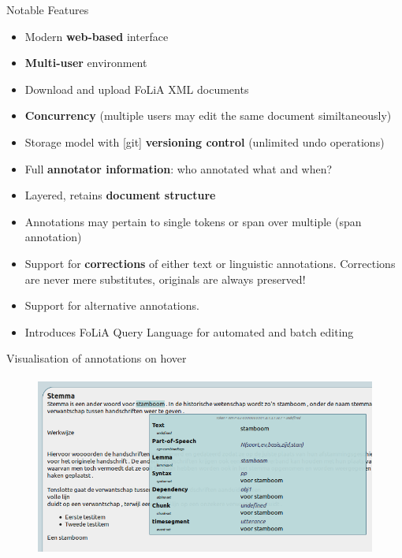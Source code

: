 \documentclass[xcolor=table,10pt,t]{beamer}
\begin{document}
\begin{frame}{Notable Features}
  \begin{block}{ }
    \begin{itemize}
      \item Modern \textbf{web-based} interface
      \item \textbf{Multi-user} environment
      \item Download and upload FoLiA XML documents
      \item \textbf{Concurrency} (multiple users may edit the same document similtaneously)
      \item Storage model with [git] \textbf{versioning control} (unlimited undo operations)
      \item Full \textbf{annotator information}: who annotated what and when?
      \item Layered, retains \textbf{document structure}
      \item Annotations may pertain to single tokens or span over multiple
        (span annotation)
      \item Support for \textbf{corrections} of either text or linguistic annotations. Corrections are never mere substitutes, originals are always preserved!
      \item Support for alternative annotations.
      \item Introduces FoLiA Query Language for automated and batch editing
    \end{itemize}
  \end{block}
\end{frame}

\begin{frame}{Visualisation of annotations on hover}
  \begin{figure}
        \includegraphics[height=6cm]{hover.png}
    \end{figure}
\end{frame}
\end{document}
